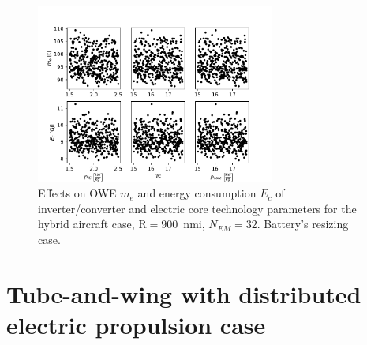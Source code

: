 \begin{figure}[h!]
	\centering
	\includegraphics[keepaspectratio, width=0.7\textwidth]{images/app_sens_plot/techno_optimization_ic_core}
	\caption{Effects on OWE $m_e$ and energy consumption $E_c$ of inverter/converter and electric core technology parameters for the hybrid aircraft case, $\textrm{R}=900$~nmi, $N_{EM}=32$. Battery's resizing case.}
	\label{fig:sens_opt_ic_core}
\end{figure}

\clearpage

\section{Tube-and-wing with distributed electric propulsion case}
\label{sec:app_sens_an_plot_hybrid_dep}

